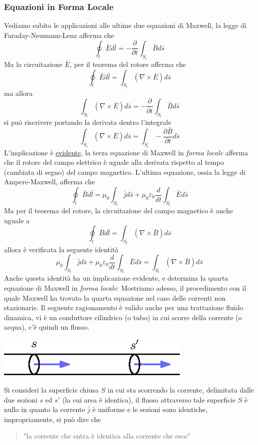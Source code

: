 \documentclass[10pt, letterpaper]{report}
\begin{document}
\subsubsection{Equazioni in Forma Locale}
Vediamo subito le applicazioni alle ultime due equazioni di Maxwell, la legge di Faraday-Neumann-Lenz afferma che 
$$ \oint_l \bar E d\bar l = -\frac{\partial}{\partial t}\int_{S_l}\bar B d\bar s$$
Ma la circuitazione $\bar E$, per il teorema del rotore afferma che 
$$ \oint_l \bar E d\bar l = \int_{S_l}(\nabla \times \bar E)d\bar s$$
ma allora 
$$\int_{S_l}(\nabla \times \bar E)d\bar s=-\frac{\partial}{ \partial t}\int_{S_l}\bar B d\bar s$$
si può riscrivere portando la derivata dentro l'integrale 
$$\int_{S_l}(\nabla \times \bar E)d\bar s=\int_{S_l}-\frac{\partial\bar B }{\partial t}d\bar s$$
L'implicazione è \underline{evidente}, la terza equazione di Maxwell in \textit{forma locale} afferma che il rotore del campo elettrico è uguale alla derivata rispetto al tempo (cambiata di segno) del campo magnetico.
L'ultima equazione, ossia la legge di Ampere-Maxwell, afferma che 
$$\oint_l \bar B d\bar l = \mu_0\int_{S_l}\bar j d\bar s+\mu_0\varepsilon_0\frac{d}{dt}\int_{S_l}\bar E d\bar s
$$
Ma per il teorema del rotore, la circuitazione del campo magnetico è anche uguale a
$$\oint_l \bar B d\bar l = \int_{S_l}(\nabla \times \bar B)d\bar s$$
allora è verificata la seguente identità 
$$ \mu_0\int_{S_l}\bar j d\bar s+\mu_0\varepsilon_0\frac{d}{dt}\int_{S_l}\bar E d\bar s=\int_{S_l}(\nabla \times \bar B)d\bar s$$
Anche questa identità ha un implicazione evidente, e determina la quarta equazione di Maxwell in \textit{forma locale}: 
Mostriamo adesso, il procedimento con il quale Maxwell ha trovato la quarta equazione nel caso delle correnti non stazionarie. Il seguente ragionamento è valido anche per una trattazione fluido dinamica, vi è un conduttore cilindrico (o tubo) in cui scorre della corrente (o acqua), c'è quindi un flusso.\begin{center}
    \includegraphics[width=0.7\textwidth]{images/4eqMax.eps}
\end{center}
Si consideri la superficie chiusa $S$ in cui sta scorrendo la corrente, delimitata dalle due sezioni $s$ ed $s'$ (la cui area è identica), il flusso attraverso tale superficie $S$ è nullo in quanto la corrente $\bar j$ è uniforme e le sezioni sono identiche, impropriamente, si può dire che \begin{quote}
    "la corrente che entra è identica alla corrente che esce"
\end{quote}
\end{document}
